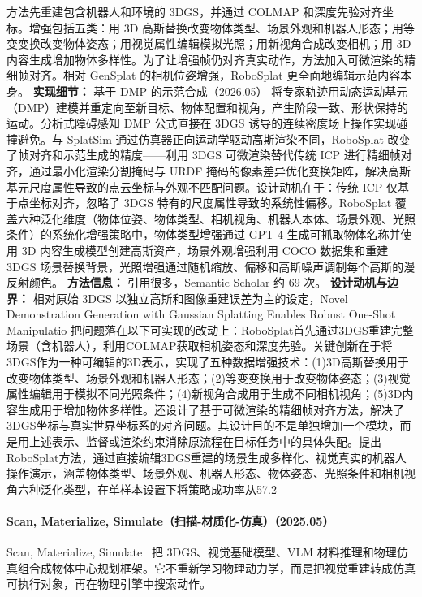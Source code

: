 方法先重建包含机器人和环境的 3DGS，并通过 COLMAP 和深度先验对齐坐标。增强包括五类：用 3D 高斯替换改变物体类型、场景外观和机器人形态；用等变变换改变物体姿态；用视觉属性编辑模拟光照；用新视角合成改变相机；用 3D 内容生成增加物体多样性。为了让增强帧仍对齐真实动作，方法加入可微渲染的精细帧对齐。相对 GenSplat 的相机位姿增强，RoboSplat 更全面地编辑示范内容本身。
\textbf{实现细节：} 基于 DMP 的示范合成（2026.05） 将专家轨迹用动态运动基元（DMP）建模并重定向至新目标、物体配置和视角，产生阶段一致、形状保持的运动。分析式障碍感知 DMP 公式直接在 3DGS 诱导的连续密度场上操作实现碰撞避免。与 SplatSim 通过仿真器正向运动学驱动高斯渲染不同，RoboSplat 改变了帧对齐和示范生成的精度——利用 3DGS 可微渲染替代传统 ICP 进行精细帧对齐，通过最小化渲染分割掩码与 URDF 掩码的像素差异优化变换矩阵，解决高斯基元尺度属性导致的点云坐标与外观不匹配问题。设计动机在于：传统 ICP 仅基于点坐标对齐，忽略了 3DGS 特有的尺度属性导致的系统性偏移。RoboSplat 覆盖六种泛化维度（物体位姿、物体类型、相机视角、机器人本体、场景外观、光照条件）的系统化增强策略中，物体类型增强通过 GPT-4 生成可抓取物体名称并使用 3D 内容生成模型创建高斯资产，场景外观增强利用 COCO 数据集和重建 3DGS 场景替换背景，光照增强通过随机缩放、偏移和高斯噪声调制每个高斯的漫反射颜色。
\textbf{方法信息：} 引用很多，Semantic Scholar 约 69 次。
\textbf{设计动机与边界：} 相对原始 3DGS 以独立高斯和图像重建误差为主的设定，Novel Demonstration Generation with Gaussian Splatting Enables Robust One-Shot Manipulatio 把问题落在以下可实现的改动上：RoboSplat首先通过3DGS重建完整场景（含机器人），利用COLMAP获取相机姿态和深度先验。关键创新在于将3DGS作为一种可编辑的3D表示，实现了五种数据增强技术：(1)3D高斯替换用于改变物体类型、场景外观和机器人形态；(2)等变变换用于改变物体姿态；(3)视觉属性编辑用于模拟不同光照条件；(4)新视角合成用于生成不同相机视角；(5)3D内容生成用于增加物体多样性。还设计了基于可微渲染的精细帧对齐方法，解决了3DGS坐标与真实世界坐标系的对齐问题。其设计目的不是单独增加一个模块，而是用上述表示、监督或渲染约束消除原流程在目标任务中的具体失配。提出RoboSplat方法，通过直接编辑3DGS重建的场景生成多样化、视觉真实的机器人操作演示，涵盖物体类型、场景外观、机器人形态、物体姿态、光照条件和相机视角六种泛化类型，在单样本设置下将策略成功率从57.2%
\paragraph{Scan, Materialize, Simulate（扫描-材质化-仿真）（2025.05）}
Scan, Materialize, Simulate~\cite{2505_14938} 把 3DGS、视觉基础模型、VLM 材料推理和物理仿真组合成物体中心规划框架。它不重新学习物理动力学，而是把视觉重建转成仿真可执行对象，再在物理引擎中搜索动作。

